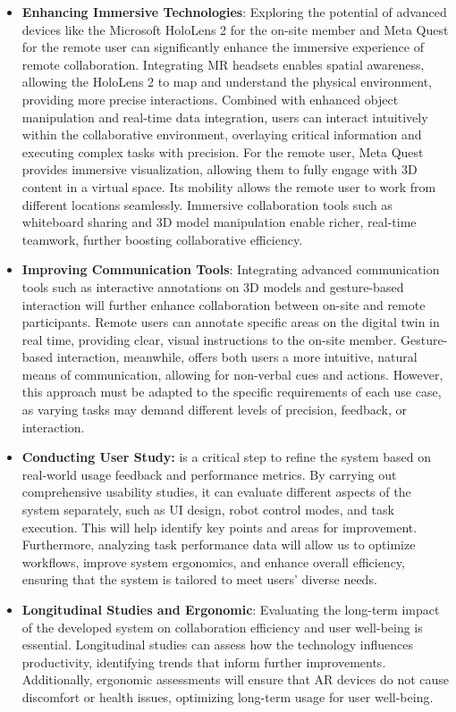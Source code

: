 \begin{itemize}
    \item \textbf{Enhancing Immersive Technologies}: Exploring the potential of advanced devices like the Microsoft HoloLens 2 for the on-site member and Meta Quest for the remote user can significantly enhance the immersive experience of remote collaboration. Integrating \ac{MR} headsets enables spatial awareness, allowing the HoloLens 2 to map and understand the physical environment, providing more precise interactions. Combined with enhanced object manipulation and real-time data integration, users can interact intuitively within the collaborative environment, overlaying critical information and executing complex tasks with precision. 
    For the remote user, Meta Quest provides immersive visualization, allowing them to fully engage with 3D content in a virtual space. Its mobility allows the remote user to work from different locations seamlessly. Immersive collaboration tools such as whiteboard sharing and 3D model manipulation enable richer, real-time teamwork, further boosting collaborative efficiency. 
    \item \textbf{Improving Communication Tools}: Integrating advanced communication tools such as interactive annotations on 3D models and gesture-based interaction will further enhance collaboration between on-site and remote participants. Remote users can annotate specific areas on the digital twin in real time, providing clear, visual instructions to the on-site member. Gesture-based interaction, meanwhile, offers both users a more intuitive, natural means of communication, allowing for non-verbal cues and actions. However, this approach must be adapted to the specific requirements of each use case, as varying tasks may demand different levels of precision, feedback, or interaction.
    \item \textbf{Conducting User Study:} is a critical step to refine the system based on real-world usage feedback and performance metrics. By carrying out comprehensive usability studies, it can evaluate different aspects of the system separately, such as \ac{UI} design, robot control modes, and task execution. This will help identify key points and areas for improvement. Furthermore, analyzing task performance data will allow us to optimize workflows, improve system ergonomics, and enhance overall efficiency, ensuring that the system is tailored to meet users' diverse needs.
    \item \textbf{Longitudinal Studies and Ergonomic}: Evaluating the long-term impact of the developed system on collaboration efficiency and user well-being is essential. Longitudinal studies can assess how the technology influences productivity, identifying trends that inform further improvements. Additionally, ergonomic assessments will ensure that \ac{AR} devices do not cause discomfort or health issues, optimizing long-term usage for user well-being. 
\end{itemize}

